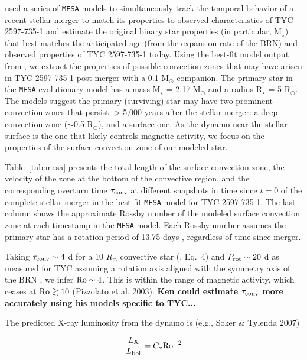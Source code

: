 \documentclass[linenumbers]{aastex631}
\begin{document}
\citet{2020Natur.587..387H} used a series of \texttt{MESA} models to simultaneously track the temporal behavior of a recent stellar merger to match its properties to observed characteristics of TYC 2597-735-1 and estimate the original binary star properties (in particular, M$_{\star}$) that best matches the anticipated age (from the expansion rate of the BRN) and observed properties of TYC 2597-735-1 today. Using the best-fit model output from \citet{2002ApJ...576L.149R}, we extract the properties of possible convection zones that may have arisen in TYC 2597-735-1 post-merger with a 0.1 M$_{\odot}$ companion. The primary star in the \texttt{MESA} evolutionary model has a mass M$_{\star}$ = 2.17 M$_{\odot}$ and a radius R$_{\star}$ = 5 R$_{\odot}$. The models suggest the primary (surviving) star may have two prominent convection zones that persist $>$5,000 years after the stellar merger: a deep convection zone ($\sim$0.5 R$_{\odot}$), and a surface one. As the dynamo near the stellar surface is the one that likely controls magnetic activity, we focus on the properties of the surface convection zone of our modeled star.




Table~\ref{tab:mesa} presents the total length of the surface convection zone, the velocity of the zone at the bottom of the convective region, and the corresponding overturn time $\tau_{\rm conv}$ at different snapshots in time since $t=0$ of the complete stellar merger in the \citet{2020Natur.587..387H} best-fit \texttt{MESA} model for TYC 2597-735-1. The last column shows the approximate Rossby number of the modeled surface convection zone at each timestamp in the \texttt{MESA} model. Each Rossby number assumes the primary star has a rotation period of 13.75 days \citep{2020Natur.587..387H}, regardless of time since merger.

Taking $\tau_{\rm conv} \sim 4$ d for a 10 $R_{\odot}$ convective star (\citealt{Soker&Tylenda2007}, Eq.~4) and $P_{\rm rot} \sim 20$ d as measured for TYC assuming a rotation axis aligned with the symmetry axis of the BRN \citep{2020Natur.587..387H}, we infer ${\rm Ro} \sim 4$.  This is within the range of magnetic activity, which ceases at ${\rm Ro} \gtrsim 10$ (Pizzolato et al. 2003).   {\bf Ken could estimate $\tau_{\rm conv}$ more accurately using his models specific to TYC...}

The predicted X-ray luminosity from the dynamo is (e.g., Soker \& Tylenda 2007)

\begin{equation}
\frac{L_{\rm X}}{L_{\rm bol}} = C_{\rm x}{\rm Ro}^{-2}
\end{equation}
\end{document}

